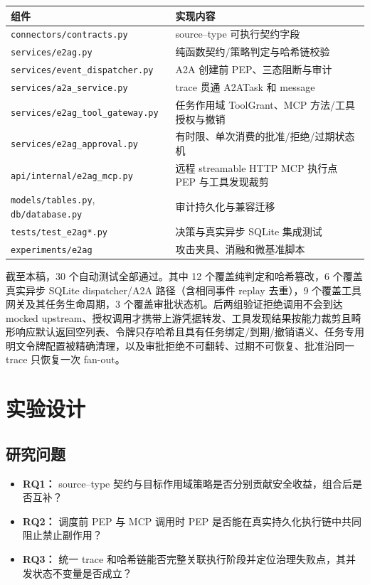 {
\begin{longtable}[]{@{}ll@{}}
\toprule\noalign{}
组件 & 实现内容 \\
\midrule\noalign{}
\endhead
\bottomrule\noalign{}
\endlastfoot
\texttt{connectors/contracts.py} & source--type 可执行契约字段 \\
\texttt{services/e2ag.py} & 纯函数契约/策略判定与哈希链校验 \\
\texttt{services/event\_dispatcher.py} & A2A 创建前 PEP、三态阻断与审计 \\
\texttt{services/a2a\_service.py} & trace 贯通 A2ATask 和 message \\
\texttt{services/e2ag\_tool\_gateway.py} & 任务作用域 ToolGrant、MCP 方法/工具授权与撤销 \\
\texttt{services/e2ag\_approval.py} & 有时限、单次消费的批准/拒绝/过期状态机 \\
\texttt{api/internal/e2ag\_mcp.py} & 远程 streamable HTTP MCP 执行点 PEP 与工具发现裁剪 \\
\texttt{models/tables.py}, \texttt{db/database.py} & 审计持久化与兼容迁移 \\
\texttt{tests/test\_e2ag*.py} & 决策与真实异步 SQLite 集成测试 \\
\texttt{experiments/e2ag} & 攻击夹具、消融和微基准脚本 \\
\end{longtable}
}

截至本稿，30 个自动测试全部通过。其中 12 个覆盖纯判定和哈希篡改，6 个覆盖真实异步 SQLite dispatcher/A2A 路径（含相同事件 replay 去重），9 个覆盖工具网关及其任务生命周期，3 个覆盖审批状态机。后两组验证拒绝调用不会到达 mocked upstream、授权调用才携带上游凭据转发、工具发现结果按能力裁剪且畸形响应默认返回空列表、令牌只存哈希且具有任务绑定/到期/撤销语义、任务专用明文令牌配置被精确清理，以及审批拒绝不可翻转、过期不可恢复、批准沿同一 trace 只恢复一次 fan-out。

\section{实验设计}\label{sec:evaluation-design}

\subsection{研究问题}\label{61-ux7814ux7a76ux95eeux9898}

\begin{itemize}
\tightlist
\item
  \textbf{RQ1：} source--type 契约与目标作用域策略是否分别贡献安全收益，组合后是否互补？
\item
  \textbf{RQ2：} 调度前 PEP 与 MCP 调用时 PEP 是否能在真实持久化执行链中共同阻止禁止副作用？
\item
  \textbf{RQ3：} 统一 trace 和哈希链能否完整关联执行阶段并定位治理失败点，其并发状态不变量是否成立？
\end{itemize}

